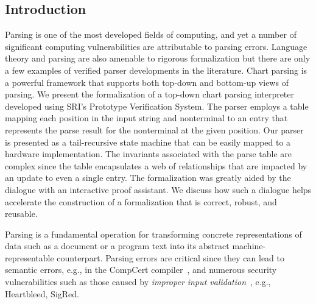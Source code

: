 \documentclass[sigplan,10pt,anonymous,review]{acmart}\settopmatter{printfolios=true,printccs=false,printacmref=false}
\begin{document}
\begin{CCSXML}


\section{Introduction}

Parsing is one of the most developed fields of computing, and yet a
number of significant computing vulnerabilities are attributable to
parsing errors.  Language theory and parsing are also amenable to
rigorous formalization but there are only a few examples of verified
parser developments in the literature.  Chart parsing is a powerful
framework that supports both top-down and bottom-up views of parsing.
We present the formalization of a top-down chart parsing interpreter
developed using SRI's Prototype Verification System.  The
parser employs a table mapping each position in the input string and
nonterminal to an entry that represents the parse result for the
nonterminal at the given position.  Our parser is presented as a
tail-recursive state machine that can be easily mapped to a hardware
implementation.  The invariants associated with the parse table are
complex since the table encapsulates a web of relationships that are
impacted by an update to even a single entry.  The formalization was
greatly aided by the dialogue with an interactive proof assistant.  We
discuss how such a dialogue helps accelerate the construction of a
formalization that is correct, robust, and reusable.

Parsing is a fundamental operation for transforming concrete
representations of data such as a document or a program text into its
abstract machine-representable counterpart.  Parsing errors are critical
since they can lead to semantic errors, e.g., in the CompCert compiler~\cite{csmith}, 
and numerous security vulnerabilities such as those caused by
\emph{improper input validation}~\cite{DBLP:journals/usenix-login/BratusHHLMPS17}, e.g., Heartbleed, SigRed.


\end{CCSXML}
\end{document}
